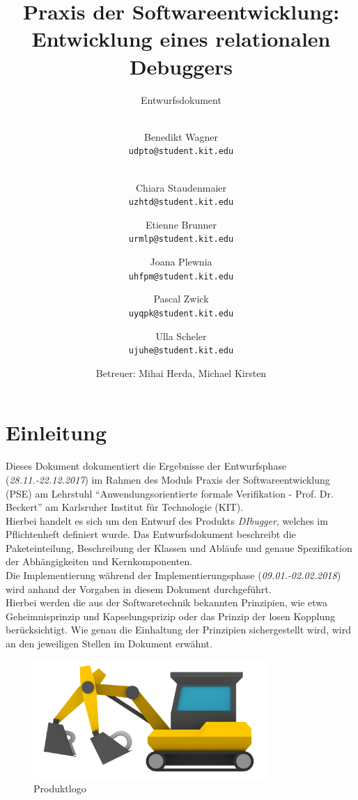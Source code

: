 \documentclass[parskip=full]{scrartcl}
\title{
	\vspace{2cm}
	\myfont 
	Praxis der Softwareentwicklung:\\ 
	Entwicklung eines relationalen Debuggers\\
}
\subtitle{
	\vspace{1cm}
	\myfont
	Entwurfsdokument
}
\author{
	\vspace{1cm} \\
	Benedikt Wagner\\
	\texttt{udpto@student.kit.edu}
	\and \vspace{1cm} \\ Chiara Staudenmaier\\
	\texttt{uzhtd@student.kit.edu}
	\and Etienne Brunner\\
	\texttt{urmlp@student.kit.edu}
	\and Joana Plewnia\\
	\texttt{uhfpm@student.kit.edu} 
	\and Pascal Zwick\\
	\texttt{uyqpk@student.kit.edu}
	\and Ulla Scheler\\
	\texttt{ujuhe@student.kit.edu}
	\vspace{1cm}
	\and Betreuer: Mihai Herda, Michael Kirsten
	\vspace{4cm}
}
\begin{document}
\clearpage
\maketitle
{}
\newpage

\tableofcontents
\newpage
{}
\section{Einleitung}
Dieses Dokument dokumentiert die Ergebnisse der Entwurfsphase (\textit{28.11.-22.12.2017}) im Rahmen
des Moduls Praxis der Softwareentwicklung (PSE) am Lehrstuhl \enquote{Anwendungsorientierte formale Verifikation - Prof. Dr. Beckert} am Karlsruher Institut für Technologie (KIT).\\
Hierbei handelt es sich um den Entwurf des Produkts \textit{DIbugger}, welches im Pflichtenheft definiert wurde. 
Das Entwurfsdokument beschreibt die Paketeinteilung, Beschreibung der Klassen und Abläufe und genaue Spezifikation der Abhängigkeiten und Kernkomponenten. 
\\Die Implementierung während der Implementierungsphase (\textit{09.01.-02.02.2018}) wird anhand der Vorgaben in diesem Dokument durchgeführt. \\
Hierbei werden die aus der Softwaretechnik bekannten Prinzipien, wie etwa Geheimnisprinzip und Kapselungsprizip oder das Prinzip der losen Kopplung berücksichtigt. Wie genau die Einhaltung der Prinzipien sichergestellt wird, wird an den jeweiligen Stellen im Dokument erwähnt. %

\vspace{1cm}
\begin{figure}[!h]
\centering
\includegraphics[width=0.8\textwidth]{../Plichtenheft/logo_nongi.png}
\caption{Produktlogo}
\end{figure}
\end{document}
